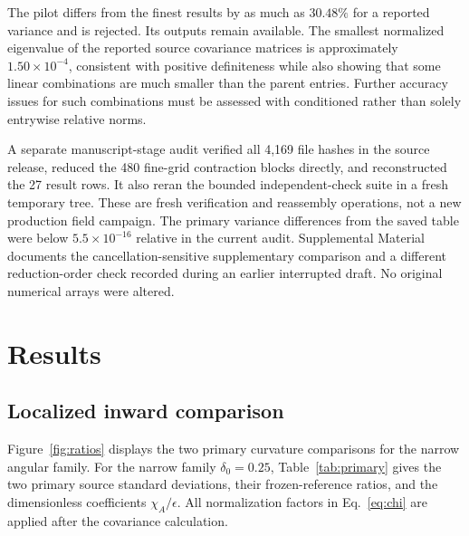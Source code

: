 \documentclass[aps,prd,reprint,floatfix,nofootinbib,longbibliography]{revtex4-2}
\newcommand{\ee}{\epsilon}
\begin{document}
The pilot differs from the finest results by as much as $30.48\%$ for a reported variance and is rejected. Its outputs remain available. The smallest normalized eigenvalue of the reported source covariance matrices is approximately $1.50\times10^{-4}$, consistent with positive definiteness while also showing that some linear combinations are much smaller than the parent entries. Further accuracy issues for such combinations must be assessed with conditioned rather than solely entrywise relative norms.

A separate manuscript-stage audit verified all 4,169 file hashes in the source release, reduced the 480 fine-grid contraction blocks directly, and reconstructed the 27 result rows. It also reran the bounded independent-check suite in a fresh temporary tree. These are fresh verification and reassembly operations, not a new production field campaign. The primary variance differences from the saved table were below $5.5\times10^{-16}$ relative in the current audit. Supplemental Material documents the cancellation-sensitive supplementary comparison and a different reduction-order check recorded during an earlier interrupted draft. No original numerical arrays were altered.

\section{Results}
\subsection{Localized inward comparison}
Figure~\ref{fig:ratios} displays the two primary curvature comparisons for the narrow angular family.
For the narrow family $\delta_0=0.25$, Table~\ref{tab:primary} gives the two primary source standard deviations, their frozen-reference ratios, and the dimensionless coefficients $\chi_A/\ee$. All normalization factors in Eq.~\eqref{eq:chi} are applied after the covariance calculation.
\end{document}
